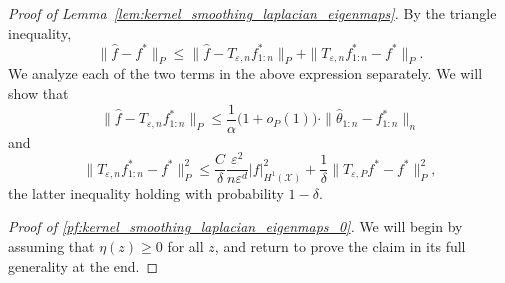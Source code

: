 \documentclass{article}
\newcommand{\1}{\mathbf{1}}
\newcommand{\mc}[1]{\mathcal{#1}}
\newcommand{\wh}[1]{\widehat{#1}}
\theoremstyle{definition}
\theoremstyle{remark}
\begin{document}
\begin{proof}[Proof of Lemma~\ref{lem:kernel_smoothing_laplacian_eigenmaps}]
	By the triangle inequality, 
	\begin{equation*}
	\|\wh{f} - f^{\ast}\|_P \leq \|\wh{f} - T_{\varepsilon,n}f^{\ast}_{1:n}\|_P + \|T_{\varepsilon,n}f^{\ast}_{1:n} - f^{\ast}\|_P.
	\end{equation*}
	We analyze each of the two terms in the above expression separately. We will show that
	\begin{equation}
	\label{pf:kernel_smoothing_laplacian_eigenmaps_0}
	\|\wh{f} - T_{\varepsilon,n}f^{\ast}_{1:n}\|_P \leq \frac{1}{\alpha}\bigl(1 + o_P(1)\bigr) \cdot \|\wh{\theta}_{1:n} - f^{\ast}_{1:n}\|_n
	\end{equation}
	and 
	\begin{equation}
	\label{pf:kernel_smoothing_laplacian_eigenmaps_0.5}
	\|T_{\varepsilon,n}f^{\ast}_{1:n} - f^{\ast}\|_P^2 \leq \frac{C}{\delta}\frac{\varepsilon^2}{n\varepsilon^d} |f|_{H^1(\mc{X})}^2 + \frac{1}{\delta}\|T_{\varepsilon,P}f^{\ast} - f^{\ast}\|_P^2,
	\end{equation}
	the latter inequality holding with probability $1 - \delta$.
	
	\textit{Proof of \eqref{pf:kernel_smoothing_laplacian_eigenmaps_0}.} We will begin by assuming that $\eta(z) \geq 0$ for all $z$, and return to prove the claim in its full generality at the end.
	

\end{proof}
\end{document}

